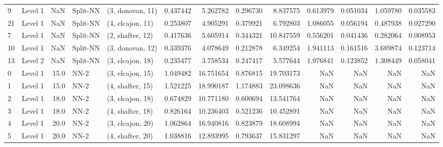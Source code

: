 \begin{tabular}{llrllrrrrrrrr}
9  &   Level 1 &    NaN &    Split-NN &  (3, donovan, 11) &   0.437442 &   5.262782 &  0.296730 &   8.837575 &             0.613979 &               0.051034 &            1.059780 &              0.035583 \\
21 &   Level 1 &    NaN &    Split-NN &  (4, elcajon, 11) &   0.253807 &   4.905291 &  0.379921 &   6.792803 &             1.086055 &               0.056194 &            0.487938 &              0.027290 \\
7  &   Level 1 &    NaN &    Split-NN &  (2, shafter, 12) &   0.417636 &   5.605914 &  0.344321 &  10.847559 &             0.556201 &               0.041436 &            0.282064 &              0.008953 \\
10 &   Level 1 &    NaN &    Split-NN &  (3, donovan, 12) &   0.339376 &   4.078649 &  0.212878 &   6.349254 &             1.941113 &               0.161516 &            3.689874 &              0.123714 \\
13 &   Level 2 &    NaN &    Split-NN &  (3, elcajon, 18) &   0.235477 &   3.758534 &  0.247417 &   5.577644 &             1.976841 &               0.123852 &            1.308449 &              0.058041 \\
0  &   Level 1 &   15.0 &        NN-2 &  (3, elcajon, 15) &   1.049482 &  16.751654 &  0.876815 &  19.703173 &                  NaN &                    NaN &                 NaN &                   NaN \\
1  &   Level 1 &   15.0 &        NN-2 &  (4, shafter, 15) &   1.521225 &  18.990187 &  1.174883 &  23.098636 &                  NaN &                    NaN &                 NaN &                   NaN \\
2  &   Level 1 &   18.0 &        NN-2 &  (3, elcajon, 18) &   0.674829 &  10.771180 &  0.600694 &  13.541764 &                  NaN &                    NaN &                 NaN &                   NaN \\
3  &   Level 1 &   18.0 &        NN-2 &  (4, shafter, 18) &   0.826164 &  10.236403 &  0.521236 &  10.452891 &                  NaN &                    NaN &                 NaN &                   NaN \\
4  &   Level 1 &   20.0 &        NN-2 &  (3, elcajon, 20) &   1.062864 &  16.940816 &  0.823879 &  18.608994 &                  NaN &                    NaN &                 NaN &                   NaN \\
5  &   Level 1 &   20.0 &        NN-2 &  (4, shafter, 20) &   1.038816 &  12.893995 &  0.793637 &  15.831297 &                  NaN &                    NaN &                 NaN &                   NaN \\

\end{tabular}
